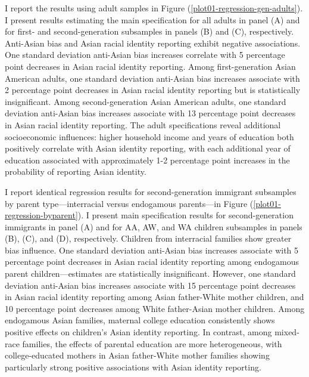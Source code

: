 I report the results using adult samples in Figure (\ref{plot01-regression-gen-adults}). I present results estimating the main specification for all adults in panel (A) and for first- and second-generation subsamples in panels (B) and (C), respectively. Anti-Asian bias and Asian racial identity reporting exhibit negative associations. One standard deviation anti-Asian bias increases correlate with 5 percentage point decreases in Asian racial identity reporting. Among first-generation Asian American adults, one standard deviation anti-Asian bias increases associate with 2 percentage point decreases in Asian racial identity reporting but is statistically insignificant. Among second-generation Asian American adults, one standard deviation anti-Asian bias increases associate with 13 percentage point decreases in Asian racial identity reporting. The adult specifications reveal additional socioeconomic influences: higher household income and years of education both positively correlate with Asian identity reporting, with each additional year of education associated with approximately 1-2 percentage point increases in the probability of reporting Asian identity.

I report identical regression results for second-generation immigrant subsamples by parent type—interracial versus endogamous parents—in Figure (\ref{plot01-regression-byparent}). I present main specification results for second-generation immigrants in panel (A) and for AA, AW, and WA children subsamples in panels (B), (C), and (D), respectively. Children from interracial families show greater bias influence. One standard deviation anti-Asian bias increases associate with 5 percentage point decreases in Asian racial identity reporting among endogamous parent children—estimates are statistically insignificant. However, one standard deviation anti-Asian bias increases associate with 15 percentage point decreases in Asian racial identity reporting among Asian father-White mother children, and 10 percentage point decreases among White father-Asian mother children. Among endogamous Asian families, maternal college education consistently shows positive effects on children's Asian identity reporting. In contrast, among mixed-race families, the effects of parental education are more heterogeneous, with college-educated mothers in Asian father-White mother families showing particularly strong positive associations with Asian identity reporting.

